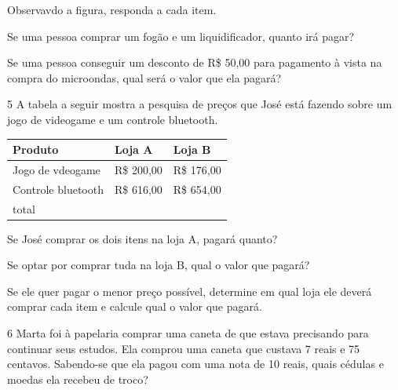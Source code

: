 \begin{multicols}{2}
{%

Observavdo a figura, responda a cada item.

\begin{escolha}

\item
  Se uma pessoa comprar um fogão e um liquidificador, quanto irá pagar?

\item
  Se uma pessoa conseguir um desconto de R\$ 50,00 para pagamento à
  vista na compra do microondas, qual será o valor que ela pagará?

\end{escolha}

\num{5} A tabela a seguir mostra a pesquisa de preços que José está fazendo
sobre um jogo de videogame e um controle bluetooth.

\begin{longtable}[]{@{}lll@{}}
\toprule
Produto & Loja A & Loja B\tabularnewline
\midrule
\endhead
Jogo de vdeogame & R\$ 200,00 & R\$ 176,00\tabularnewline
Controle bluetooth & R\$ 616,00 & R\$ 654,00\tabularnewline
total & &\tabularnewline
\bottomrule
\end{longtable}

\begin{escolha}

\item
  Se José comprar os dois itens na loja A, pagará quanto?

\item
  Se optar por comprar tuda na loja B, qual o valor que pagará?

\item
  Se ele quer pagar o menor preço possível, determine em qual loja ele
  deverá comprar cada item e calcule qual o valor que pagará.
\end{escolha}

\num{6} Marta foi à papelaria comprar uma caneta de que estava precisando para
continuar seus estudos. Ela comprou uma caneta que custava 7 reais e 75
centavos. Sabendo-se que ela pagou com uma nota de 10 reais, quais
cédulas e moedas ela recebeu de troco?

}
\end{multicols}
